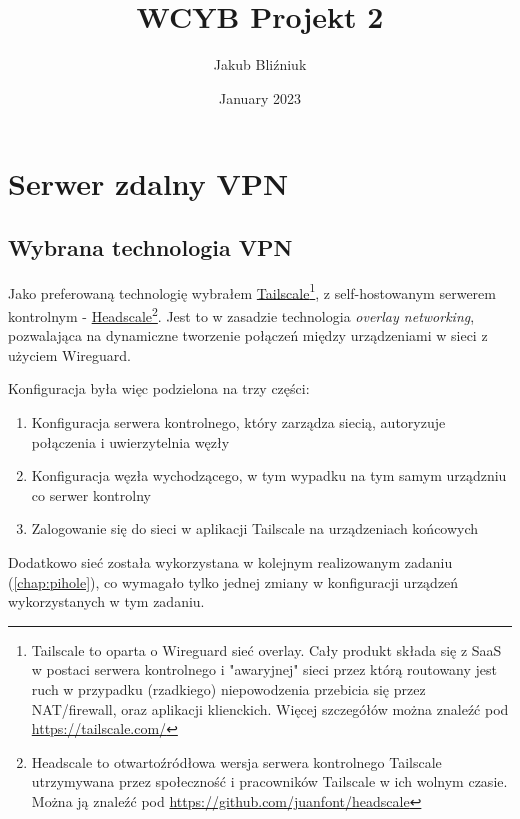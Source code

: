 \documentclass{report}
\title{WCYB Projekt 2}
\author{Jakub Bliźniuk}
\date{January 2023}
\numberwithin{equation}{section}
\begin{document}
\pagestyle{fancy}
\fancyfoot{}
\fancyfoot[C]{\thepage}

\begin{titlepage}
    \vfill
    \maketitle
    \thispagestyle{fancy}
\end{titlepage}
\tableofcontents
\thispagestyle{fancy}
\setcounter{chapter}{4}
\chapter{Serwer zdalny VPN}
\section{Wybrana technologia VPN}
Jako preferowaną technologię wybrałem \href{https://tailscale.com}{Tailscale}\footnote{Tailscale to oparta o Wireguard sieć overlay. Cały produkt składa się z SaaS w postaci serwera kontrolnego i "awaryjnej" sieci przez którą routowany jest ruch w przypadku (rzadkiego) niepowodzenia przebicia się przez NAT/firewall, oraz aplikacji klienckich. Więcej szczegółów można znaleźć pod \url{https://tailscale.com/}}, z self-hostowanym serwerem kontrolnym - \href{https://github.com/juanfont/headscale}{Headscale}\footnote{Headscale to otwartoźródłowa wersja serwera kontrolnego Tailscale utrzymywana przez społeczność i pracowników Tailscale w ich wolnym czasie. Można ją znaleźć pod \url{https://github.com/juanfont/headscale}}. Jest to w zasadzie technologia \textit{overlay networking}, pozwalająca na dynamiczne tworzenie połączeń między urządzeniami w sieci z użyciem Wireguard.

Konfiguracja była więc podzielona na trzy części:
\begin{enumerate}
    \item Konfiguracja serwera kontrolnego, który zarządza siecią, autoryzuje połączenia i uwierzytelnia węzły
    \item Konfiguracja węzła wychodzącego, w tym wypadku na tym samym urządzniu co serwer kontrolny
    \item Zalogowanie się do sieci w aplikacji Tailscale na urządzeniach końcowych
\end{enumerate}

Dodatkowo sieć została wykorzystana w kolejnym realizowanym zadaniu (\autoref{chap:pihole}), co wymagało tylko jednej zmiany w konfiguracji urządzeń wykorzystanych w tym zadaniu.
\end{document}
